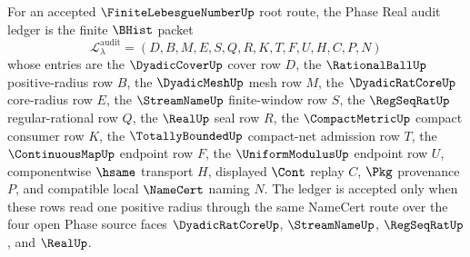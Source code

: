 \begin{definition}
\label{def:finite-lebesgue-number-phase-real-audit-ledger}
For an accepted $\FiniteLebesgueNumberUp$ root route, the Phase Real audit ledger is the finite $\BHist$ packet
$$
\mathcal{L}_{\lambda}^{\mathrm{audit}}=(D,B,M,E,S,Q,R,K,T,F,U,H,C,P,N)
$$
whose entries are the $\DyadicCoverUp$ cover row $D$, the $\RationalBallUp$ positive-radius row $B$, the $\DyadicMeshUp$ mesh row $M$, the $\DyadicRatCoreUp$ core-radius row $E$, the $\StreamNameUp$ finite-window row $S$, the $\RegSeqRatUp$ regular-rational row $Q$, the $\RealUp$ seal row $R$, the $\CompactMetricUp$ compact consumer row $K$, the $\TotallyBoundedUp$ compact-net admission row $T$, the $\ContinuousMapUp$ endpoint row $F$, the $\UniformModulusUp$ endpoint row $U$, componentwise $\hsame$ transport $H$, displayed $\Cont$ replay $C$, $\Pkg$ provenance $P$, and compatible local $\NameCert$ naming $N$. The ledger is accepted only when these rows read one positive radius through the same NameCert route over the four open Phase source faces $\DyadicRatCoreUp$, $\StreamNameUp$, $\RegSeqRatUp$, and $\RealUp$.
\end{definition}

